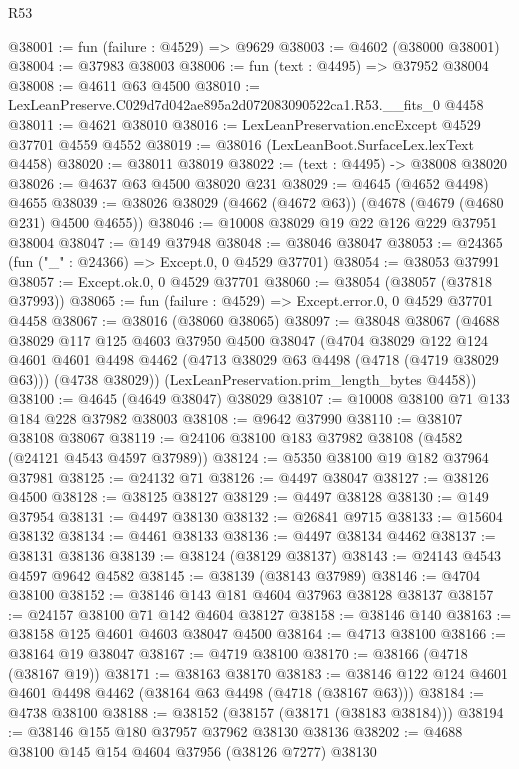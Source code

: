 \begin{lexlean}{R53}
\begin{coremodule}
@38001 := fun (failure : @4529) => @9629
@38003 := @4602 (@38000 @38001)
@38004 := @37983 @38003
@38006 := fun (text : @4495) => @37952 @38004
@38008 := @4611 @63 @4500
@38010 := LexLeanPreserve.C029d7d042ae895a2d072083090522ca1.R53.__fits_0 @4458
@38011 := @4621 @38010
@38016 := LexLeanPreservation.encExcept @4529 @37701 @4559 @4552
@38019 := @38016 (LexLeanBoot.SurfaceLex.lexText @4458)
@38020 := @38011 @38019
@38022 := (text : @4495) -> @38008 @38020
@38026 := @4637 @63 @4500 @38020 @231
@38029 := @4645 (@4652 @4498) @4655
@38039 := @38026 @38029 (@4662 (@4672 @63)) (@4678 (@4679 (@4680 @231) @4500 @4655))
@38046 := @10008 @38029 @19 @22 @126 @229 @37951 @38004
@38047 := @149 @37948
@38048 := @38046 @38047
@38053 := @24365 (fun ("_" : @24366) => Except.{0, 0} @4529 @37701)
@38054 := @38053 @37991
@38057 := Except.ok.{0, 0} @4529 @37701
@38060 := @38054 (@38057 (@37818 @37993))
@38065 := fun (failure : @4529) => Except.error.{0, 0} @4529 @37701 @4458
@38067 := @38016 (@38060 @38065)
@38097 := @38048
    @38067
    (@4688
      @38029
      @117
      @125
      @4603
      @37950
      @4500
      @38047
      (@4704
        @38029
        @122
        @124
        @4601
        @4601
        @4498
        @4462
        (@4713 @38029 @63 @4498 (@4718 (@4719 @38029 @63)))
        (@4738 @38029))
      (LexLeanPreservation.prim_length_bytes @4458))
@38100 := @4645 (@4649 @38047) @38029
@38107 := @10008 @38100 @71 @133 @184 @228 @37982 @38003
@38108 := @9642 @37990
@38110 := @38107 @38108 @38067
@38119 := @24106 @38100 @183 @37982 @38108 (@4582 (@24121 @4543 @4597 @37989))
@38124 := @5350 @38100 @19 @182 @37964 @37981
@38125 := @24132 @71
@38126 := @4497 @38047
@38127 := @38126 @4500
@38128 := @38125 @38127
@38129 := @4497 @38128
@38130 := @149 @37954
@38131 := @4497 @38130
@38132 := @26841 @9715
@38133 := @15604 @38132
@38134 := @4461 @38133
@38136 := @4497 @38134 @4462
@38137 := @38131 @38136
@38139 := @38124 (@38129 @38137)
@38143 := @24143 @4543 @4597 @9642 @4582
@38145 := @38139 (@38143 @37989)
@38146 := @4704 @38100
@38152 := @38146 @143 @181 @4604 @37963 @38128 @38137
@38157 := @24157 @38100 @71 @142 @4604 @38127
@38158 := @38146 @140
@38163 := @38158 @125 @4601 @4603 @38047 @4500
@38164 := @4713 @38100
@38166 := @38164 @19 @38047
@38167 := @4719 @38100
@38170 := @38166 (@4718 (@38167 @19))
@38171 := @38163 @38170
@38183 := @38146 @122 @124 @4601 @4601 @4498 @4462 (@38164 @63 @4498 (@4718 (@38167 @63)))
@38184 := @4738 @38100
@38188 := @38152 (@38157 (@38171 (@38183 @38184)))
@38194 := @38146 @155 @180 @37957 @37962 @38130 @38136
@38202 := @4688 @38100 @145 @154 @4604 @37956 (@38126 @7277) @38130

\end{coremodule}
\end{lexlean}
